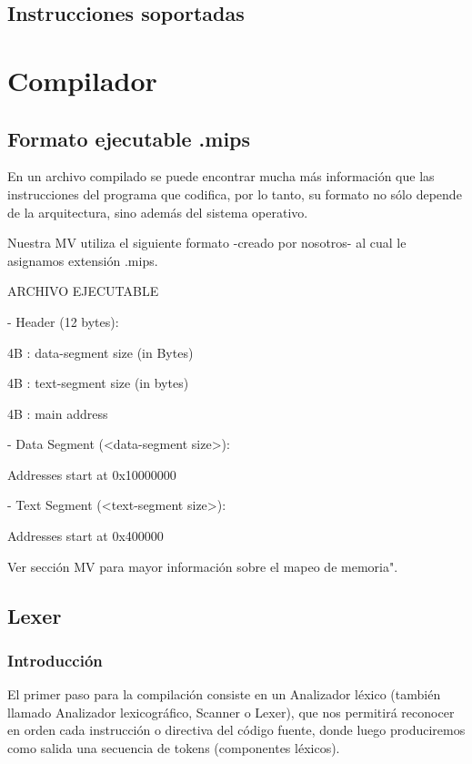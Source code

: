 \documentclass[12pt]{article}
\begin{document}
\subsection{Instrucciones soportadas}
    
\section{Compilador}
\subsection{Formato ejecutable .mips}

En un archivo compilado se puede encontrar mucha más información que las instrucciones del programa que codifica, por lo tanto, su formato no sólo depende de la arquitectura, sino además del sistema operativo.

Nuestra MV utiliza el siguiente formato -creado por nosotros- al cual le asignamos extensión .mips.


ARCHIVO EJECUTABLE

- Header (12 bytes):

    4B : data-segment size (in Bytes)

    4B : text-segment size (in bytes)

    4B : main address

- Data Segment (<data-segment size>):

    Addresses start at 0x10000000

- Text Segment (<text-segment size>):

    Addresses start at 0x400000

Ver sección MV para mayor información sobre el mapeo de memoria".

\subsection{Lexer}

\subsubsection{Introducción}

El primer paso para la compilación consiste en un Analizador léxico (también llamado Analizador lexicográfico, Scanner o Lexer), que nos permitirá reconocer en orden cada instrucción o directiva del código fuente, donde luego produciremos como salida una secuencia de tokens (componentes léxicos).
\end{document}
